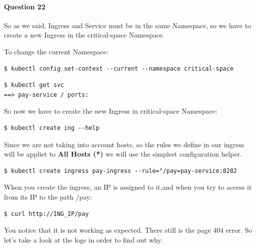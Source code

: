 \documentclass{article}
\newenvironment{codetemplate}[1][]{%
  \mybasecolorbox[#1]
  \itshape
}{%
  \endmybasecolorbox
}
\begin{document}
\paragraph{Question 22}

So as we said, Ingress and Service must be in the same Namespace, so we have to create a new Ingress in the critical-space Namespace.

To change the current Namespace:

\begin{codetemplate}{}
\begin{verbatim}
$ kubectl config set-context --current --namespace critical-space
\end{verbatim}
\end{codetemplate}

\begin{codetemplate}{}
\begin{verbatim}
$ kubectl get svc
==> pay-service / ports: 
\end{verbatim}
\end{codetemplate}

So now we have to create the new Ingress in critical-space Namespace:
\begin{codetemplate}{}
\begin{verbatim}
$ kubectl create ing --help
\end{verbatim}
\end{codetemplate}

Since we are not taking into account hosts, so the rules we define in our ingress will be appliet to \textbf{All Hosts (*)} we will use the simplest configuration helper.

\begin{codetemplate}{}
\begin{verbatim}
$ kubectl create ingress pay-ingress --rule="/pay=pay-service:8282
\end{verbatim}
\end{codetemplate}

When you create the ingress, an IP is assigned to it,and when you try to access it from its IP to the path /pay:

\begin{codetemplate}{}
\begin{verbatim}
$ curl http://ING_IP/pay
\end{verbatim}
\end{codetemplate}

You notice that it is not working as expected. There still is the page 404 error. So let's take a look at the logs in order to find out why.
\end{document}
